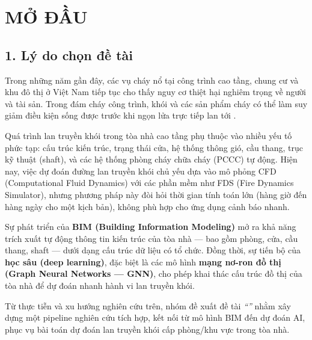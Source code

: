 
\chapter*{MỞ ĐẦU}

\section*{1. Lý do chọn đề tài}

Trong những năm gần đây, các vụ cháy nổ tại công trình cao tầng, chung cư và khu đô thị ở Việt Nam tiếp tục cho thấy nguy cơ thiệt hại nghiêm trọng về người và tài sản. Trong đám cháy công trình, khói và các sản phẩm cháy có thể làm suy giảm điều kiện sống được trước khi ngọn lửa trực tiếp lan tới \cite{iso13571,sfpe_handbook}.

Quá trình lan truyền khói trong tòa nhà cao tầng phụ thuộc vào nhiều yếu tố phức tạp: cấu trúc kiến trúc, trạng thái cửa, hệ thống thông gió, cầu thang, trục kỹ thuật (shaft), và các hệ thống phòng cháy chữa cháy (PCCC) tự động. Hiện nay, việc dự đoán đường lan truyền khói chủ yếu dựa vào mô phỏng CFD (Computational Fluid Dynamics) với các phần mềm như FDS (Fire Dynamics Simulator), nhưng phương pháp này đòi hỏi thời gian tính toán lớn (hàng giờ đến hàng ngày cho một kịch bản), không phù hợp cho ứng dụng cảnh báo nhanh.

Sự phát triển của \textbf{BIM (Building Information Modeling)} mở ra khả năng trích xuất tự động thông tin kiến trúc của tòa nhà — bao gồm phòng, cửa, cầu thang, shaft — dưới dạng cấu trúc dữ liệu có tổ chức. Đồng thời, sự tiến bộ của \textbf{học sâu (deep learning)}, đặc biệt là các mô hình \textbf{mạng nơ-ron đồ thị (Graph Neural Networks — GNN)}, cho phép khai thác cấu trúc đồ thị của tòa nhà để dự đoán nhanh hành vi lan truyền khói.

Từ thực tiễn và xu hướng nghiên cứu trên, nhóm đề xuất đề tài \textit{``\detai''} nhằm xây dựng một pipeline nghiên cứu tích hợp, kết nối từ mô hình BIM đến dự đoán AI, phục vụ bài toán dự đoán lan truyền khói cấp phòng/khu vực trong tòa nhà.


